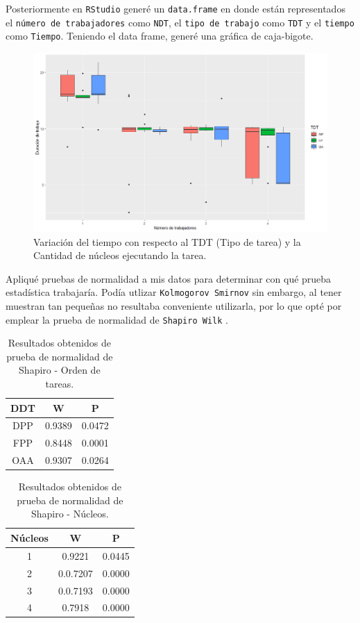 \documentclass{article}
\begin{document}
Posteriormente en \texttt{RStudio} gener\'e un \texttt{data.frame} en donde est\'an representados el \texttt{n\'umero de trabajadores} como \texttt{NDT}, el \texttt{tipo de trabajo} como \texttt{TDT} y el \texttt{tiempo} como \texttt{Tiempo}.
Teniendo el data frame, gener\'e una gr\'afica de caja-bigote.
\begin{figure}[h!] %
    \centering
    \includegraphics[width=150mm]{Boxplot.JPG} %
    \caption{Variaci\'on del tiempo con respecto al TDT (Tipo de tarea) y la Cantidad de n\'ucleos ejecutando la tarea.}
    \label{Figura 1}
\end{figure}

Apliqu\'e pruebas de normalidad a mis datos para determinar con  qu\'e prueba estad\'istica trabajar\'ia.
Pod\'ia utlizar \texttt{Kolmogorov Smirnov} sin embargo, al tener muestran tan pequeñas no resultaba conveniente utilizarla, por lo que opt\'e por emplear la prueba de normalidad de \texttt{Shapiro Wilk} \cite{PruebasNormalidad}.

\begin{table}[ht]
    \centering
    \caption{Resultados obtenidos de prueba de normalidad de Shapiro - Orden de tareas.} 
    \begin{tabular}{|c|c|c|}
    \hline
    DDT & W & P  \\
    \hline
    DPP & 0.9389 & 0.0472 \\
    \hline
    FPP & 0.8448 & 0.0001 \\
    \hline
    OAA & 0.9307 & 0.0264\\
    \hline
\end{tabular}
    \label{cuadro 1}
\end{table}

\begin{table}[ht]
    \centering
    \caption{Resultados obtenidos de prueba de normalidad de Shapiro - N\'ucleos.} 
    \begin{tabular}{|c|c|c|}
    \hline
    N\'ucleos & W & P  \\
    \hline
    1 & 0.9221 & 0.0445 \\
    \hline
    2 & 0.0.7207 & 0.0000 \\
    \hline
    3 & 0.0.7193 & 0.0000 \\
    \hline
    4 & 0.7918 & 0.0000 \\
    \hline
\end{tabular}
    \label{cuadro 2}
\end{table}
\end{document}
